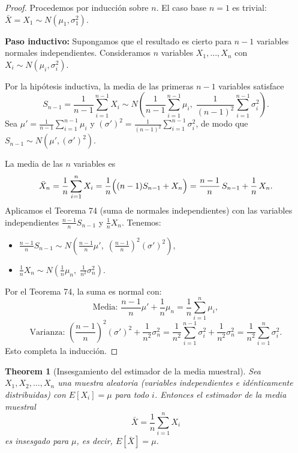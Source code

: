\documentclass[11pt,a4paper]{article}
\theoremstyle{plain}
\newtheorem{theorem}{Theorem}[section]
\theoremstyle{definition}
\theoremstyle{remark}
\begin{document}
\begin{proof}
Procedemos por inducción sobre $n$. El caso base $n = 1$ es trivial: $\bar{X} = X_1 \sim N(\mu_1, \sigma_1^2)$.

\textbf{Paso inductivo:} Supongamos que el resultado es cierto para $n - 1$ variables normales independientes. Consideramos $n$ variables $X_1, \ldots, X_n$ con $X_i \sim N(\mu_i, \sigma_i^2)$.

Por la hipótesis inductiva, la media de las primeras $n-1$ variables satisface
\[
S_{n-1} = \frac{1}{n-1}\sum_{i=1}^{n-1} X_i \sim N\!\left(\frac{1}{n-1}\sum_{i=1}^{n-1} \mu_i,\; \frac{1}{(n-1)^2}\sum_{i=1}^{n-1} \sigma_i^2\right).
\]
Sea $\mu' = \frac{1}{n-1}\sum_{i=1}^{n-1} \mu_i$ y $(\sigma')^2 = \frac{1}{(n-1)^2}\sum_{i=1}^{n-1} \sigma_i^2$, de modo que $S_{n-1} \sim N(\mu', (\sigma')^2)$.

La media de las $n$ variables es
\[
\bar{X}_n = \frac{1}{n}\sum_{i=1}^n X_i = \frac{1}{n}\Bigl((n-1)S_{n-1} + X_n\Bigr) = \frac{n-1}{n}\,S_{n-1} + \frac{1}{n}\,X_n.
\]
Aplicamos el Teorema 74 (suma de normales independientes) con las variables independientes $\frac{n-1}{n}S_{n-1}$ y $\frac{1}{n}X_n$. Tenemos:
\begin{itemize}
\item $\frac{n-1}{n}S_{n-1} \sim N\!\left(\frac{n-1}{n}\mu',\; \left(\frac{n-1}{n}\right)^2(\sigma')^2\right)$,
\item $\frac{1}{n}X_n \sim N\!\left(\frac{1}{n}\mu_n,\; \frac{1}{n^2}\sigma_n^2\right)$.
\end{itemize}
Por el Teorema 74, la suma es normal con:
\[
\text{Media: } \frac{n-1}{n}\mu' + \frac{1}{n}\mu_n = \frac{1}{n}\sum_{i=1}^n \mu_i,
\]
\[
\text{Varianza: } \left(\frac{n-1}{n}\right)^2(\sigma')^2 + \frac{1}{n^2}\sigma_n^2 = \frac{1}{n^2}\sum_{i=1}^{n-1}\sigma_i^2 + \frac{1}{n^2}\sigma_n^2 = \frac{1}{n^2}\sum_{i=1}^n \sigma_i^2.
\]
Esto completa la inducción.
\end{proof}


\begin{theorem}[Insesgamiento del estimador de la media muestral]
Sea $X_1, X_2, \ldots, X_n$ una muestra aleatoria (variables independientes e idénticamente distribuidas) con $E[X_i] = \mu$ para todo $i$. Entonces el estimador de la media muestral
\[
\bar{X} = \frac{1}{n}\sum_{i=1}^n X_i
\]
es insesgado para $\mu$, es decir, $E[\bar{X}] = \mu$.
\end{theorem}
\end{document}
